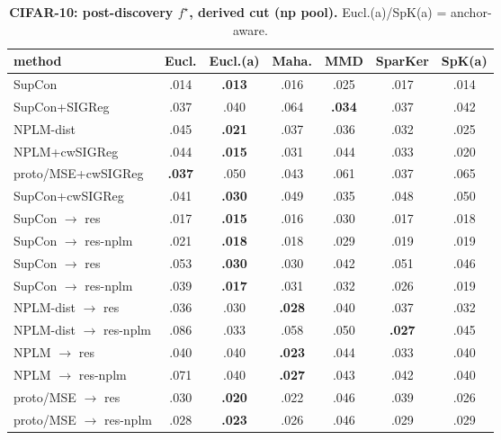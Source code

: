 \documentclass[10pt]{article}
\begin{document}
\begin{table}[t]
\centering
\footnotesize

\begin{tabular}{lcccccc}
\toprule
method & Eucl. & Eucl.(a) & Maha. & MMD & SparKer & SpK(a) \\
\midrule
SupCon & .014 & \textbf{.013} & .016 & .025 & .017 & .014 \\
SupCon+SIGReg & .037 & .040 & .064 & \textbf{.034} & .037 & .042 \\
NPLM-dist & .045 & \textbf{.021} & .037 & .036 & .032 & .025 \\
NPLM+cwSIGReg & .044 & \textbf{.015} & .031 & .044 & .033 & .020 \\
proto/MSE+cwSIGReg & \textbf{.037} & .050 & .043 & .061 & .037 & .065 \\
SupCon+cwSIGReg & .041 & \textbf{.030} & .049 & .035 & .048 & .050 \\
\quad SupCon $\to$ res & .017 & \textbf{.015} & .016 & .030 & .017 & .018 \\
\quad SupCon $\to$ res-nplm & .021 & \textbf{.018} & .018 & .029 & .019 & .019 \\
\quad SupCon $\to$ res & .053 & \textbf{.030} & .030 & .042 & .051 & .046 \\
\quad SupCon $\to$ res-nplm & .039 & \textbf{.017} & .031 & .032 & .026 & .019 \\
\quad NPLM-dist $\to$ res & .036 & .030 & \textbf{.028} & .040 & .037 & .032 \\
\quad NPLM-dist $\to$ res-nplm & .086 & .033 & .058 & .050 & \textbf{.027} & .045 \\
\quad NPLM $\to$ res & .040 & .040 & \textbf{.023} & .044 & .033 & .040 \\
\quad NPLM $\to$ res-nplm & .071 & .040 & \textbf{.027} & .043 & .042 & .040 \\
\quad proto/MSE $\to$ res & .030 & \textbf{.020} & .022 & .046 & .039 & .026 \\
\quad proto/MSE $\to$ res-nplm & .028 & \textbf{.023} & .026 & .046 & .029 & .029 \\
\bottomrule
\end{tabular}

\caption{\textbf{CIFAR-10: post-discovery $f^\star$, derived cut (np pool).} Eucl.(a)/SpK(a) = anchor-aware.}
\label{tab:CIFAR-10leg}
\end{table}
\end{document}
